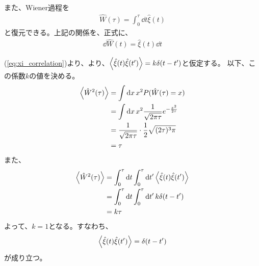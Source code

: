 \documentclass[a4paper,11pt]{jsarticle}
\numberwithin{equation}{section}
\begin{document}
また、Wiener過程を
\begin{align}
    \hat{W}(\tau) = \int_0^{\tau} \dd{t} \hat{\xi}(t)
\end{align}
と復元できる。上記の関係を、正式に、
\begin{align}
    \dd{\hat{W}(t)} = \hat{\xi}(t) \dd{t}
\end{align}

(\ref{eq:xi_correlation})より、より、$\ev{\hat{\xi}(t) \hat{\xi}(t')} = k\delta(t-t')$と仮定する。
以下、この係数$k$の値を決める。
\begin{align}
  \ev{\hat{W}^2(\tau)} &= \int \dd{x}x^2 P(\hat{W}(\tau)=x) \\
  &= \int \dd{x}x^2 \frac{1}{\sqrt{2\pi \tau}} e^{-\frac{x^2}{2\tau}} \\
  &= \frac{1}{\sqrt{2\pi \tau}} \cdot \frac{1}{2} \sqrt{(2\tau)^3 \pi} \\
  &= \tau
\end{align}
また、
\begin{align}
  \ev{\hat{W}^2(\tau)} &= \int_0^{\tau} \dd{t} \int_0^{\tau} \dd{t'} \ev{\hat{\xi}(t) \hat{\xi}(t')} \\
  &= \int_0^{\tau} \dd{t} \int_0^{\tau} \dd{t'} k\delta(t-t') \\
  &= k\tau
\end{align}
よって、$k=1$となる。すなわち、
\begin{align}
    \ev{\hat{\xi}(t) \hat{\xi}(t')} = \delta(t-t')
\end{align}
が成り立つ。\\
\end{document}
